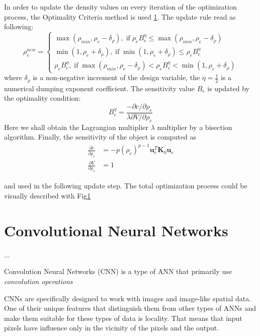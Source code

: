 In order to update the density values on every iteration of the optimization process, the Optimality Criteria method is used \ref{}.
The update rule read as following:
\[ \rho^{new}_{e} = 
\begin{cases}
	\max(\rho_{min},\rho_{e}-\delta_{\rho}) , \; \mathrm{if} \; \rho_{e}B^{\eta}_{e} \leq \max(\rho_{min},\rho_{e}-\delta_{\rho}) \\
	\min(1,\rho_{e}+\delta_{\rho}), \; \mathrm{if} \; \min(1,\rho_{e}+\delta_{\rho}) \leq \rho_{e}B^{\eta}_{e}\\
	\rho_{e}B^{\eta}_{e}, \; \mathrm{if} \; \max(\rho_{min},\rho_{e}-\delta_{\rho}) < \rho_{e}B^{\eta}_{e} < \min(1,\rho_{e}+\delta_{\rho}) 
\end{cases}
\]
where $\delta_{\rho}$ is a non-negative increment of the design variable, the $\eta = \frac{1}{2} $ is a numerical dumping exponent coefficient.
The sensitivity value $B_{e}$ is updated by the optimality condition:
\begin{equation}
	B^{\eta}_{e} = \frac{-\partial c / \partial \rho_{e}}{\lambda \partial V / \partial \rho_{e}}
\end{equation}
Here we shall obtain the Lagrangian multiplier $\lambda$ multiplier by a bisection algorithm.
Finally, the sensitivity of the object is computed as 
\begin{align*}
	\frac{\partial c}{\partial \rho_{e}} & = -p(\rho_{e})^{p-1} \mathbf{u}^{T}_{e} \mathbf{K}_{0} \mathbf{u}_{e}\\
	\frac{\partial V}{\partial \rho_{e}} & = 1
\end{align*}

and used in the following update step.
The total optimization process could be visually described with Fig\ref{}



\section{Convolutional Neural Networks}

...

Convolution Neural Networks (CNN) is a type of ANN that primarily use \textit{convolution operations}

CNNs are specifically designed to work with images and image-like spatial data.
One of their unique features that distinguish them from other types of ANNs and make them suitable for these types of data is locality.
That means that input pixels have influence only in the vicinity of the pixels and the output.

